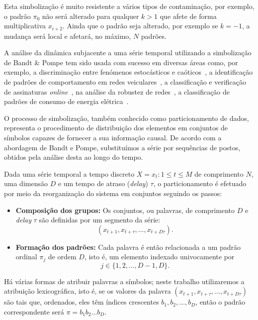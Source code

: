 Esta simbolização é muito resistente a vários tipos de contaminação, por exemplo, o padrão $\pi_0$ não será alterado para qualquer $k>1$ que afete de forma multiplicativa $x_{i+2}$.
Ainda que o padrão seja alterado, por exemplo se $k=-1$, a mudança será local e afetará, no máximo, $N$ padrões.
 
A análise da dinâmica subjacente a uma série temporal utilizando a simbolização de Bandt \& Pompe tem sido usada com sucesso em diversas áreas como, por exemplo, 
a discriminação entre fenómenos estocásticos e caóticos~\cite{DistinguishingNoiseFromChaos}, 
a identificação de padrões de comportamento em redes veiculares~\cite{CharacterizationVehicleBehaviorInformationTheory},
a classificação e verificação de assinaturas \textit{online}~\cite{ClassificationVerificationOnlineHandwrittenSignatures},
na análise da robustez de redes~\cite{InformationTheoryPerspectiveNetworkRobustness},
a classificação de padrões de consumo de energia elétrica~\cite{CharacterizationElectricLoadInformationTheoryQuantifiers}.

O processo de simbolização, também conhecido como particionamento de dados, representa o procedimento de distribuição dos elementos em conjuntos de símbolos capazes de fornecer a sua informação causal. 
De acordo com a abordagem de Bandt e Pompe, substituímos a série por sequências de postos, obtidos pela análise desta ao longo do tempo.

Dada uma série temporal a tempo discreto $X = {x_t:1\leq t\leq M}$ de comprimento $N$, uma dimensão $D$ e um tempo de atraso (\textit{delay}) $\tau$, o particionamento é efetuado por meio da reorganização do sistema em conjuntos seguindo os passos:
\begin{itemize}
	\item \textbf{Composição dos grupos:} Os conjuntos, ou palavras, de comprimento $D$ e \textit{delay} $\tau$ são definidas por um segmento da série: 
	 $$ (x_{t+1},x_{t+\tau},\ldots, x_{t+D\tau}).$$ 

	\item \textbf{Formação dos padrões: } Cada palavra é então relacionada a um padrão ordinal $\pi_j$ de ordem $D$, isto é, um elemento indexado univocamente por
	$$ j\in\{1, 2,\ldots, D-1, D\}. $$
\end{itemize}

Há várias formas de atribuir palavras a símbolos; neste trabalho utilizaremos a atribuição lexicográfica, isto é, se os valores da palavra $(x_{t+1},x_{t+\tau},\ldots, x_{t+D\tau})$ são tais que, ordenados, eles têm índices crescentes $b_1,b_2,\dots,b_D$, então o padrão correspondente será $\pi=b_1b_2\dots b_D$.


